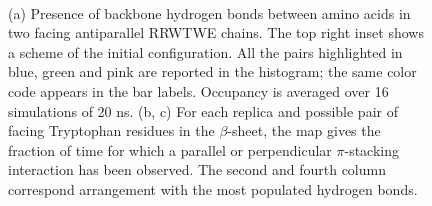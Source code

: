 \begin{figure}[t]
\centering
{} \\
\bigskip
{} \hspace{0.2cm}
\caption[Hydrogen bonds between RRWTWE $\beta$-sheet]{(a) Presence of backbone hydrogen bonds between amino acids in two facing antiparallel RRWTWE chains. The top right inset shows a scheme of the initial configuration. All the pairs highlighted in blue, green and pink are reported in the histogram; the same color code appears in the bar labels. Occupancy is averaged over 16 simulations of 20 ns. (b, c) For each replica and possible pair of facing Tryptophan residues in the $\beta$-sheet, the map gives the fraction of time for which a parallel or perpendicular $\pi$-stacking interaction has been observed. The second and fourth column correspond arrangement with the most populated hydrogen bonds.}
\label{fig:hb_beta_SIhere}
\end{figure}

